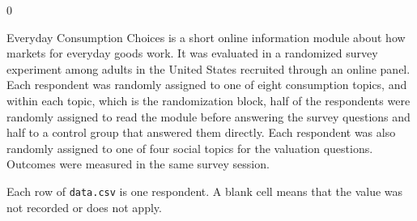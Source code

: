 \documentclass[10pt,border=0pt]{standalone}
\newlength{\promptwidth}
\newenvironment{promptbox}
  {\begin{lrbox}{0}\begin{minipage}{\dimexpr\promptwidth-2\fboxsep\relax}\small\setlength{\parskip}{0.5em}}
  {\end{minipage}\end{lrbox}\colorbox{promptbg}{\usebox{0}}}
\begin{document}
\begin{promptbox}
Everyday Consumption Choices is a short online information module about how markets for everyday goods work. It was evaluated in a randomized survey experiment among adults in the United States recruited through an online panel. Each respondent was randomly assigned to one of eight consumption topics, and within each topic, which is the randomization block, half of the respondents were randomly assigned to read the module before answering the survey questions and half to a control group that answered them directly. Each respondent was also randomly assigned to one of four social topics for the valuation questions. Outcomes were measured in the same survey session.

Each row of \texttt{data.csv} is one respondent. A blank cell means that the value was not recorded or does not apply.
\end{promptbox}
\end{document}
